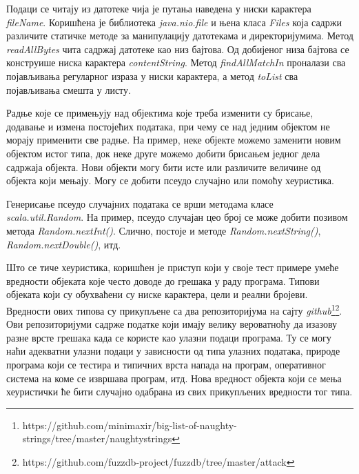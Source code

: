 \documentclass[12pt,oneside]{memoir}
\begin{document}
Подаци се читају из датотеке чија је путања наведена у ниски карактера \textit{fileName}. Коришћена је библиотека \textit{java.nio.file} и њена класа \textit{Files} која садржи различите статичке методе за манипулацију датотекама и директоријумима. Метод \textit{readAllBytes} чита садржај датотеке као низ бајтова. Од добијеног низа бајтова се конструише ниска карактера \textit{contentString}. Метод \textit{findAllMatchIn} проналази сва појављивања регуларног израза у ниски карактера, а метод \textit{toList} сва појављивања смешта у листу.

Радње које се примењују над објектима које треба изменити су брисање, додавање и измена постојећих података, при чему се над једним објектом не морају применити све радње. На пример, неке објекте можемо заменити новим објектом истог типа, док неке друге можемо добити брисањем једног дела садржаја објекта. Нови објекти могу бити исте или различите величине од објекта који мењају. Могу се  добити псеудо случајно или помоћу хеуристика. 

Генерисање псеудо случајних података се врши методама класе \textit{scala.util.Random}. На пример, псеудо случајан цео број се може добити позивом метода \textit{Random.nextInt()}. Слично, постоје и методе \textit{Random.nextString()}, \textit{Random.nextDouble()}, итд. 

Што се тиче хеуристика, коришћен је приступ који у своје тест примере умеће вредности објеката које често доводе до грешака у раду програма. Типови објеката који су обухваћени су ниске карактера, цели и реални бројеви. Вредности ових типова су прикупљене са два репозиторијума на сајту \textit{github}\footnote{https://github.com/minimaxir/big-list-of-naughty-strings/tree/master/naughtystrings}\footnote{https://github.com/fuzzdb-project/fuzzdb/tree/master/attack}. Ови репозиторијуми садрже податке који имају велику вероватноћу да изазову разне врсте грешака када се користе као улазни подаци програма. Ту се могу наћи адекватни улазни подаци у зависности од типа улазних података, природе програма који се тестира и типичних врста напада на програм, оперативног система на коме се извршава програм, итд. Нова вредност објекта који се мења хеуристички ће бити случајно одабрана из свих прикупљених вредности тог типа.
\end{document}
